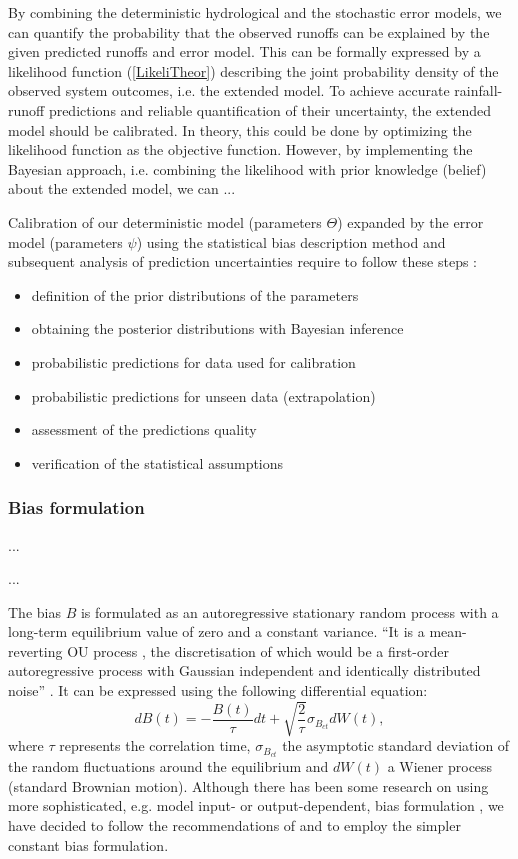 \documentclass{ctuthesis}\usepackage[]{graphicx}\usepackage[]{color}
\begin{document}
By combining the deterministic hydrological and the stochastic error models, we can quantify the probability that the observed runoffs can be explained by the given predicted runoffs and error model. This can be formally expressed by a likelihood function (\ref{LikeliTheor}) describing the joint probability density of the observed system outcomes, i.e. the extended model. To achieve accurate rainfall-runoff predictions and reliable quantification of their uncertainty, the extended model should be calibrated. In theory, this could be done by optimizing the likelihood function as the objective function. However, by implementing the Bayesian approach, i.e. combining the likelihood with prior knowledge (belief) about the extended model, we can ...

Calibration of our deterministic model (parameters $\Theta$) expanded by the error model (parameters $\psi$) using the statistical bias description method and subsequent analysis of prediction uncertainties require to follow these steps \citep{giudice2013improving}:
\begin{itemize}
	\item  definition of the prior distributions of the parameters
	\item  obtaining the posterior distributions with Bayesian inference
	\item  probabilistic predictions for  data used for calibration
	\item  probabilistic predictions for unseen data (extrapolation)
	\item  assessment of the predictions quality
	\item verification of the statistical assumptions
\end{itemize}


\subsubsection{Bias formulation} \label{biasTheor}

...

...

The bias $B$ is formulated as an autoregressive stationary random process with a long-term equilibrium value of zero and a constant variance. \enquote{It is a mean-reverting OU process \citep{uhlenbeck1930theory}, the discretisation of which would be a first-order autoregressive process with Gaussian independent and identically distributed noise} \citep{giudice2013improving}. It can be expressed using the following differential equation:
\begin{equation} 
dB (t)= - \frac{B (t)}{\tau}dt + \sqrt{\frac{2}{\tau}} \sigma_{B_{ct}}  dW(t),
\end{equation}
where $\tau$ represents the correlation time, $\sigma_{B_{ct}}$ the asymptotic standard deviation of the random fluctuations around the equilibrium and $dW(t)$ a Wiener process (standard Brownian motion). Although there has been some research on using more sophisticated, e.g. model input- or output-dependent, bias formulation \citep{honti2013integrated}, we have decided to follow the recommendations of \cite{giudice2013improving} and to employ the simpler constant bias formulation.
\end{document}

